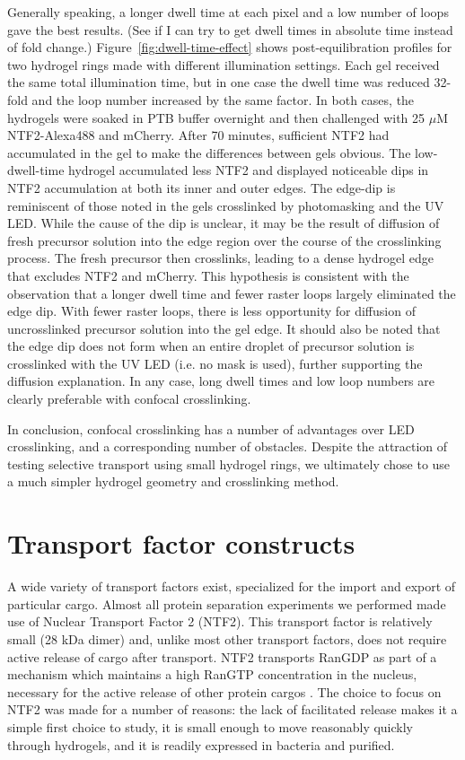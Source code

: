 Generally speaking, a longer dwell time at each pixel and a low number of loops gave the best results.  (See if I can try to get dwell times in absolute time instead of fold change.)  Figure~\ref{fig:dwell-time-effect} shows post-equilibration profiles for two hydrogel rings made with different illumination settings.  Each gel received the same total illumination time, but in one case the dwell time was reduced 32-fold and the loop number increased by the same factor.  In both cases, the hydrogels were soaked in PTB buffer overnight and then challenged with 25 $\mu$M NTF2-Alexa488 and mCherry.  After 70 minutes, sufficient NTF2 had accumulated in the gel to make the differences between gels obvious.  The low-dwell-time hydrogel accumulated less NTF2 and displayed noticeable dips in NTF2 accumulation at both its inner and outer edges.  The edge-dip is reminiscent of those noted in the gels crosslinked by photomasking and the UV LED.  While the cause of the dip is unclear, it may be the result of diffusion of fresh precursor solution into the edge region over the course of the crosslinking process.  The fresh precursor then crosslinks, leading to a dense hydrogel edge that excludes NTF2 and mCherry.  This hypothesis is consistent with the observation that a longer dwell time and fewer raster loops largely eliminated the edge dip.  With fewer raster loops, there is less opportunity for diffusion of uncrosslinked precursor solution into the gel edge.  It should also be noted that the edge dip does not form when an entire droplet of precursor solution is crosslinked with the UV LED (i.e. no mask is used), further supporting the diffusion explanation.  In any case, long dwell times and low loop numbers are clearly preferable with confocal crosslinking.

In conclusion, confocal crosslinking has a number of advantages over LED crosslinking, and a corresponding number of obstacles.  Despite the attraction of testing selective transport using small hydrogel rings, we ultimately chose to use a much simpler hydrogel geometry and crosslinking method.

\section{Transport factor constructs}

A wide variety of transport factors exist, specialized for the import and export of particular cargo.  Almost all protein separation experiments we performed made use of Nuclear Transport Factor 2 (NTF2).  This transport factor is relatively small (28 kDa dimer) and, unlike most other transport factors, does not require active release of cargo after transport. NTF2 transports RanGDP as part of a mechanism which maintains a high RanGTP concentration in the nucleus, necessary for the active release of other protein cargos \cite{ribbeck98}.  The choice to focus on NTF2 was made for a number of reasons: the lack of facilitated release makes it a simple first choice to study, it is small enough to move reasonably quickly through hydrogels, and it is readily expressed in bacteria and purified.

